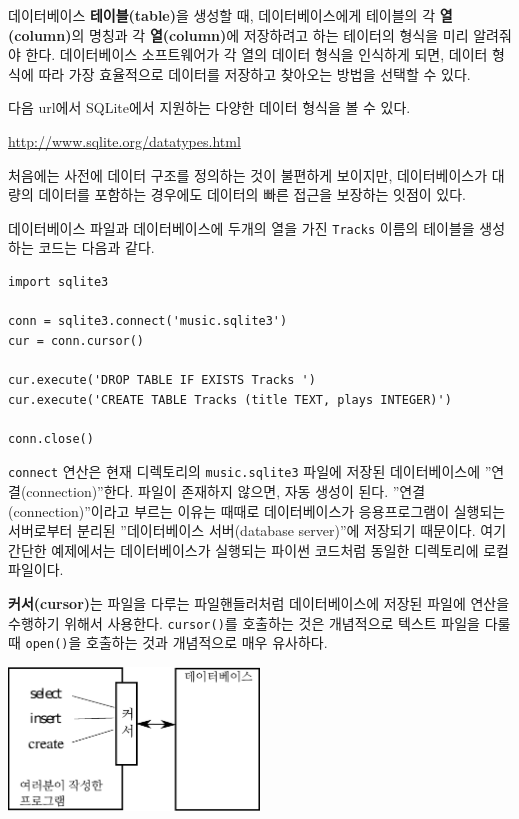 데이터베이스 {\bf 테이블(table)}을 생성할 때, 데이터베이스에게 테이블의 각 {\bf 열(column)}의 명칭과 각 {\bf 열(column)}에
저장하려고 하는 테이터의 형식을 미리 알려줘야 한다.
데이터베이스 소프트웨어가 각 열의 데이터 형식을 인식하게 되면, 데이터 형식에 따라 가장 효율적으로 데이터를 저장하고 찾아오는 방법을 선택할 수 있다.

다음 url에서 SQLite에서 지원하는 다양한 데이터 형식을 볼 수 있다.

\url{http://www.sqlite.org/datatypes.html}

처음에는 사전에 데이터 구조를 정의하는 것이 불편하게 보이지만, 데이터베이스가 대량의 데이터를 포함하는 경우에도 데이터의 빠른 접근을 보장하는 잇점이 있다.

데이터베이스 파일과 데이터베이스에 두개의 열을 가진 {\tt Tracks} 이름의 테이블을 생성하는 코드는 다음과 같다.

\beforeverb
\begin{verbatim}
import sqlite3

conn = sqlite3.connect('music.sqlite3')
cur = conn.cursor()

cur.execute('DROP TABLE IF EXISTS Tracks ')
cur.execute('CREATE TABLE Tracks (title TEXT, plays INTEGER)')

conn.close()
\end{verbatim}
\afterverb
%


{\tt connect} 연산은 현재 디렉토리의 {\tt music.sqlite3} 파일에 저장된 데이터베이스에 ''연결(connection)''한다.
파일이 존재하지 않으면, 자동 생성이 된다. ''연결(connection)''이라고 부르는 이유는 때때로 데이터베이스가 응용프로그램이 실행되는 서버로부터
분리된 ''데이터베이스 서버(database server)''에 저장되기 때문이다.
여기 간단한 예제에서는 데이터베이스가 실행되는 파이썬 코드처럼 동일한 디렉토리에 로컬 파일이다.

{\bf 커서(cursor)}는 파일을 다루는 파일핸들러처럼 데이터베이스에 저장된 파일에 연산을 수행하기 위해서 사용한다.
{\tt cursor()}를 호출하는 것은 개념적으로 텍스트 파일을 다룰 때 {\tt open()}을 호출하는 것과 개념적으로 매우 유사하다.

\beforefig
\centerline{\includegraphics[height=1.50in]{figs2/cursor.eps}}
\afterfig

